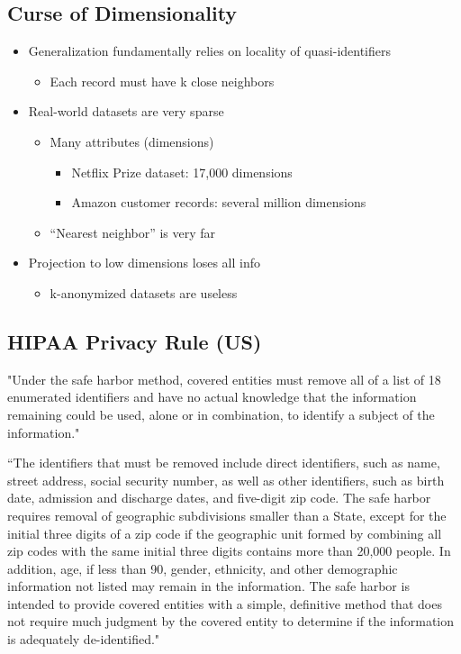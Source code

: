 \documentclass[11pt]{article}
\theoremstyle{definition}
\begin{document}
\subsection{Curse of Dimensionality}
\begin{itemize}
    \item Generalization fundamentally relies on locality of quasi-identifiers
    \begin{itemize}
        \item Each record must have k close neighbors
    \end{itemize}
    \item Real-world datasets are very sparse
    \begin{itemize}
        \item Many attributes (dimensions)
        \begin{itemize}
            \item Netflix Prize dataset: 17,000 dimensions
            \item Amazon customer records: several million dimensions
        \end{itemize}
        \item “Nearest neighbor” is very far
    \end{itemize}
    \item Projection to low dimensions loses all info
    \begin{itemize}
        \item k-anonymized datasets are useless
    \end{itemize}
\end{itemize}

\subsection{HIPAA Privacy Rule (US)}
"Under the safe harbor method, covered entities must remove all of a
list of 18 enumerated identifiers and have no actual knowledge that
the information remaining could be used, alone or in combination, to
identify a subject of the information."

“The identifiers that must be removed include direct identifiers, such
as name, street address, social security number, as well as other
identifiers, such as birth date, admission and discharge dates, and
five-digit zip code. The safe harbor requires removal of geographic
subdivisions smaller than a State, except for the initial three digits of a
zip code if the geographic unit formed by combining all zip codes with
the same initial three digits contains more than 20,000 people. In
addition, age, if less than 90, gender, ethnicity, and other demographic
information not listed may remain in the information. The safe harbor
is intended to provide covered entities with a simple, definitive method
that does not require much judgment by the covered entity to
determine if the information is adequately de-identified."
\end{document}

